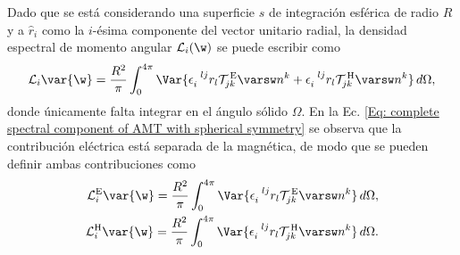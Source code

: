 Dado que se está considerando una superficie $s$ de integración esférica de radio $R$ y a $\hat{r}_i$ como la $i$-ésima componente del vector unitario radial, la densidad espectral de momento angular $\mathcal{L}_i(\w)$ se puede escribir como
\begin{equation}
\mathcal{L}_i\var{\w} = \frac{R^2}{\pi} \int_0^{4\pi} \Var{\epsilon_{i}^{\,\,\,\, lj} r_l \mathcal{T}^{\, \rm E}_{jk}\varsw n^k + \epsilon_{i}^{\,\,\,\, lj} r_l \mathcal{T}^{\, \rm H}_{jk}\varsw n^k}\,d\Omega,
\label{Eq: complete spectral component of AMT with spherical symmetry}
\end{equation}
donde únicamente falta integrar en el ángulo sólido $\Omega$. En la Ec. \eqref{Eq: complete spectral component of AMT with spherical symmetry} se observa que la contribución eléctrica está separada de la magnética, de modo que se pueden definir ambas contribuciones como
\begin{align}
\mathcal{L}_i^{\rm E}\var{\w} = \frac{R^2}{\pi} \int_0^{4\pi} \Var{\epsilon_{i}^{\,\,\,\, lj} r_l \mathcal{T}^{\,\rm E}_{jk}\varsw n^k}\,d\Omega, \\
\mathcal{L}_i^{\rm H}\var{\w} = \frac{R^2}{\pi} \int_0^{4\pi} \Var{\epsilon_{i}^{\,\,\,\, lj} r_l \mathcal{T}^{\,\rm H}_{jk}\varsw n^k}\,d\Omega.
\end{align}

